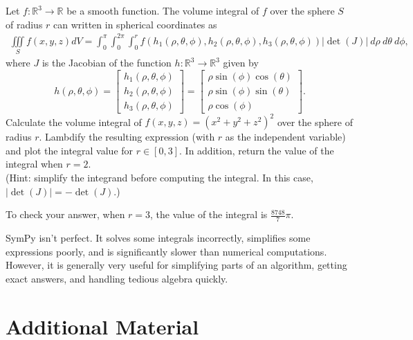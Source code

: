 \begin{problem}
Let $f:\mathbb{R}^3\rightarrow\mathbb{R}$ be a smooth function.
The volume integral of $f$ over the sphere $S$ of radius $r$ can written in spherical coordinates as
\begin{align*}
\underset{S}{\iiint} f(x,y,z) dV = \int_0^\pi\int_0^{2\pi}\int_0^r f(h_1(\rho, \theta, \phi), h_2(\rho, \theta, \phi), h_3(\rho, \theta, \phi)) |\det(J)| \:d\rho\:d\theta\:d\phi,
\end{align*}
where $J$ is the Jacobian of the function $h:\mathbb{R}^3\rightarrow\mathbb{R}^3$ given by
\[
h(\rho, \theta, \phi) =
\left[\begin{array}{c}
h_1(\rho, \theta, \phi) \\
h_2(\rho, \theta, \phi) \\
h_3(\rho, \theta, \phi)
\end{array}\right]
=
\left[\begin{array}{c}
\rho\sin(\phi)\cos(\theta) \\
\rho\sin(\phi)\sin(\theta) \\
\rho\cos(\phi)
\end{array}\right].
\]
Calculate the volume integral of $f(x,y,z) = (x^2 + y^2 + z^2)^2$ over the sphere of radius $r$.
Lambdify the resulting expression (with $r$ as the independent variable) and plot the integral value for $r \in [0, 3]$.
In addition, return the value of the integral when $r=2$.
\\ (Hint: simplify the integrand before computing the integral.
In this case, $|\det(J)| = -\det(J)$.)

To check your answer, when $r=3$, the value of the integral is $\frac{8748}{7}\pi$.
\end{problem}

\begin{warn}
SymPy isn't perfect.
It solves some integrals incorrectly, simplifies some expressions poorly, and is significantly slower than numerical computations.
However, it is generally very useful for simplifying parts of an algorithm, getting exact answers, and handling tedious algebra quickly.
\end{warn}

\newpage

\section*{Additional Material} %

